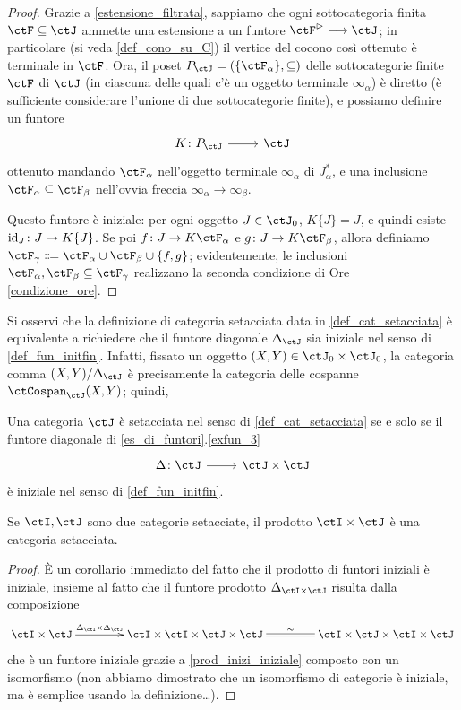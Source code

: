 \begin{proof}
 Grazie a \ref{estensione_filtrata}, sappiamo che ogni sottocategoria finita \(\ctF\subseteq\ctJ\) ammette una estensione a un funtore \(\ctF^\rhd\fun\ctJ\); in particolare (si veda \ref{def_cono_su_C}) il vertice del cocono così ottenuto è terminale in \(\ctF\). Ora, il poset \(P_\ctJ = (\{\ctF_\alpha\},\subseteq)\) delle sottocategorie finite \(\ctF\) di \(\ctJ\) (in ciascuna delle quali c'è un oggetto terminale \(\infty_\alpha\)) è diretto (è sufficiente considerare l'unione di due sottocategorie finite), e possiamo definire un funtore
 \[\dmFun{K}{P_\ctJ}{\ctJ}\]
 ottenuto mandando \(\ctF_\alpha\) nell'oggetto terminale \(\infty_\alpha\) di \(J_\alpha^*\), e una inclusione \(\ctF_\alpha\subseteq\ctF_\beta\) nell'ovvia freccia \(\infty_\alpha\to\infty_\beta\).

 Questo funtore è iniziale: per ogni oggetto \(J\in\ctJ_0\), \(K\{J\}=J\), e quindi esiste \(\Id[J] \colon J\to K\{J\}\). Se poi \(f \colon J\to K\ctF_\alpha\) e \(g \colon J\to K\ctF_\beta\), allora definiamo \(\ctF_\gamma \defeq  \ctF_\alpha\cup\ctF_\beta\cup\{f,g\}\); evidentemente, le inclusioni \(\ctF_\alpha,\ctF_\beta\subseteq\ctF_\gamma\) realizzano la seconda condizione di Ore \ref{condizione_ore}.
\end{proof}
Si osservi che la definizione di categoria setacciata data in \ref{def_cat_setacciata} è equivalente a richiedere che il funtore diagonale \(\Delta_\ctJ\) sia iniziale nel senso di \ref{def_fun_initfin}. Infatti, fissato un oggetto \((X,Y)\in\ctJ_0\times\ctJ_0\), la categoria comma \((X,Y)/\Delta_\ctJ\) è precisamente la categoria delle cospanne \(\ctCospan_\ctJ(X,Y)\); quindi,
\begin{theorem}\label{thm_catprod_setacciata}
 Una categoria \(\ctJ\) è setacciata nel senso di \ref{def_cat_setacciata} se e solo se il funtore diagonale di \ref{es_di_funtori}.\ref{exfun_3}
 \[\dmFun{\Delta}{\ctJ}{\ctJ\times\ctJ}\]
 è iniziale nel senso di \ref{def_fun_initfin}.
\end{theorem}
\begin{theorem}
 Se \(\ctI,\ctJ\) sono due categorie setacciate, il prodotto \(\ctI\times\ctJ\) è una categoria setacciata.
\end{theorem}
\begin{proof}
 È un corollario immediato del fatto che il prodotto di funtori iniziali è iniziale,  insieme al fatto che il funtore prodotto \(\Delta_{\ctI\times\ctJ}\) risulta dalla composizione
 \[\xymatrix@C=1.5cm{
  \ctI\times\ctJ \ar[r]^-{\Delta_\ctI\times\Delta_\ctJ} & \ctI\times\ctI\times \ctJ\times\ctJ\ar@{=}[r]^\sim & \ctI\times\ctJ\times \ctI\times\ctJ
  }\]
 che è un funtore iniziale grazie a \ref{prod_inizi_iniziale} composto con un isomorfismo (non abbiamo dimostrato che un isomorfismo di categorie è iniziale, ma è semplice usando la definizione\dots).
\end{proof}
